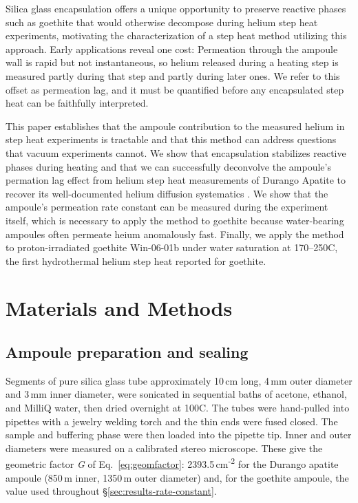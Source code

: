 Silica glass encapsulation offers a unique opportunity to preserve reactive phases such as goethite that would otherwise decompose during helium step heat experiments, motivating the characterization of a step heat method utilizing this approach. Early applications reveal one cost: Permeation through the ampoule wall is rapid but not instantaneous, so helium released during a heating step is measured partly during that step and partly during later ones. We refer to this offset as permeation lag, and it must be quantified before any encapsulated step heat can be faithfully interpreted.

This paper establishes that the ampoule contribution to the measured helium in step heat experiments is tractable and that this method can address questions that vacuum experiments cannot. We show that encapsulation stabilizes reactive phases during heating and that we can successfully deconvolve the ampoule's permation lag effect from helium step heat measurements of Durango Apatite to recover its well-documented helium diffusion systematics \citep{wolf1998, farley2000}. We show that the ampoule's permeation rate constant can be measured during the experiment itself, which is necessary to apply the method to goethite because water-bearing ampoules often permeate heium anomalously fast. Finally, we apply the method to proton-irradiated goethite Win-06-01b under water saturation at 170--250\textdegree C, the first hydrothermal helium step heat reported for goethite.

\section{Materials and Methods}\label{sec:methods}

\subsection{Ampoule preparation and sealing}\label{sec:ampoule-prep}

Segments of pure silica glass tube approximately 10\,cm long, 4\,mm outer diameter and 3\,mm inner diameter, were sonicated in sequential baths of acetone, ethanol, and MilliQ water, then dried overnight at 100\textdegree C. The tubes were hand-pulled into pipettes with a jewelry welding torch and the thin ends were fused closed. The sample and buffering phase were then loaded into the pipette tip. Inner and outer diameters were measured on a calibrated stereo microscope. These give the geometric factor \emph{G} of Eq.~\eqref{eq:geomfactor}: 2393.5\,cm\textsuperscript{-2} for the Durango apatite ampoule (850\,\textmu m inner, 1350\,\textmu m outer diameter) and, for the goethite ampoule, the value used throughout \S\ref{sec:results-rate-constant}.

